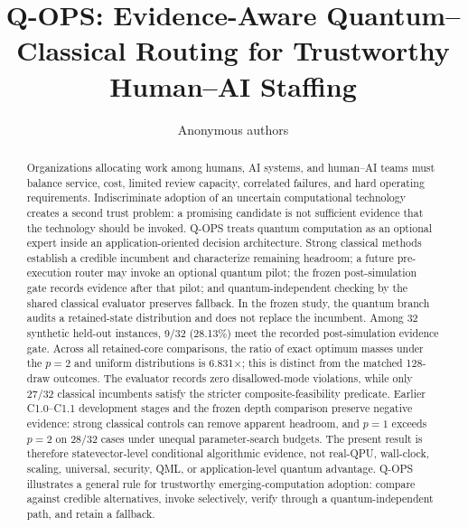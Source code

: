 \documentclass{article}
\title{Q-OPS: Evidence-Aware Quantum--Classical Routing for Trustworthy Human--AI Staffing}
\author{Anonymous authors}
\begin{document}
\maketitle

\begin{abstract}
Organizations allocating work among humans, AI systems, and human--AI teams must balance service, cost, limited review capacity, correlated failures, and hard operating requirements. Indiscriminate adoption of an uncertain computational technology creates a second trust problem: a promising candidate is not sufficient evidence that the technology should be invoked. Q-OPS treats quantum computation as an optional expert inside an application-oriented decision architecture. Strong classical methods establish a credible incumbent and characterize remaining headroom; a future pre-execution router may invoke an optional quantum pilot; the frozen post-simulation gate records evidence after that pilot; and quantum-independent checking by the shared classical evaluator preserves fallback. In the frozen study, the quantum branch audits a retained-state distribution and does not replace the incumbent. Among 32 synthetic held-out instances, 9/32 (28.13\%) meet the recorded post-simulation evidence gate. Across all retained-core comparisons, the ratio of exact optimum masses under the $p=2$ and uniform distributions is 6.831$\times$; this is distinct from the matched 128-draw outcomes. The evaluator records zero disallowed-mode violations, while only 27/32 classical incumbents satisfy the stricter composite-feasibility predicate. Earlier C1.0--C1.1 development stages and the frozen depth comparison preserve negative evidence: strong classical controls can remove apparent headroom, and $p=1$ exceeds $p=2$ on 28/32 cases under unequal parameter-search budgets. The present result is therefore statevector-level conditional algorithmic evidence, not real-QPU, wall-clock, scaling, universal, security, QML, or application-level quantum advantage. Q-OPS illustrates a general rule for trustworthy emerging-computation adoption: compare against credible alternatives, invoke selectively, verify through a quantum-independent path, and retain a fallback.
\end{abstract}











\appendix








\end{document}
